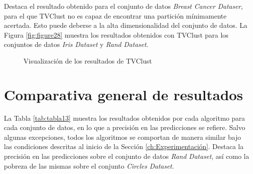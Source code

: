 Destaca el resultado obtenido para el conjunto de datos \textit{Breast Cancer Dataser}, para el que \acs{TVClust} no es capaz de encontrar una partición mínimamente acertada. Esto puede deberse a la alta dimensionalidad del conjunto de datos. La Figura \ref{fig:figure28} muestra los resultados obtenidos con \acs{TVClust} para los conjuntos de datos \textit{Iris Dataset} y \textit{Rand Dataset}. 


\begin{figure}[bth]
	\myfloatalign
	\caption{Visualización de los resultados de \acs{TVClust}}\label{fig:figure29}
\end{figure}

\clearpage

\section{Comparativa general de resultados}

La Tabla \ref{tab:tabla13} muestra los resultados obtenidos por cada algoritmo para cada conjunto de datos, en lo que a precisión en las predicciones se refiere. Salvo algunas excepciones, todos los algoritmos se comportan de manera similar bajo las condiciones descritas al inicio de la Sección \ref{ch:Experimentación}. Destaca la precisión en las predicciones sobre el conjunto de datos \textit{Rand Dataset}, así como la pobreza de las mismas sobre el conjunto \textit{Circles Dataset}.

